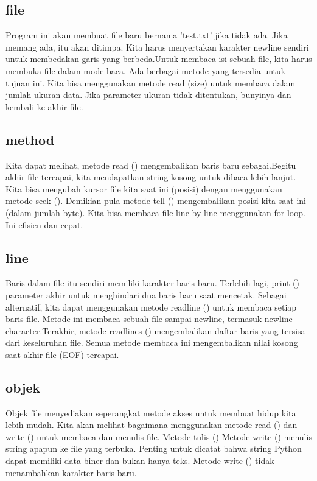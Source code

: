 \subsection{file}
Program ini akan membuat file baru bernama 'test.txt' jika tidak ada. Jika memang ada, itu akan ditimpa. Kita harus menyertakan karakter newline sendiri untuk membedakan garis yang berbeda.Untuk membaca isi sebuah file, kita harus membuka file dalam mode baca. Ada berbagai metode yang tersedia untuk tujuan ini. Kita bisa menggunakan metode read (size) untuk membaca dalam jumlah ukuran data. Jika parameter ukuran tidak ditentukan, bunyinya dan kembali ke akhir file. 

\subsection{method}
Kita dapat melihat, metode read () mengembalikan baris baru sebagai.Begitu akhir file tercapai, kita mendapatkan string kosong untuk dibaca lebih lanjut. Kita bisa mengubah kursor file kita saat ini (posisi) dengan menggunakan metode seek (). Demikian pula metode tell () mengembalikan posisi kita saat ini (dalam jumlah byte). Kita bisa membaca file line-by-line menggunakan for loop. Ini efisien dan cepat. 

\subsection{line}
Baris dalam file itu sendiri memiliki karakter baris baru. Terlebih lagi, print () parameter akhir untuk menghindari dua baris baru saat mencetak. Sebagai alternatif, kita dapat menggunakan metode readline () untuk membaca setiap baris file. Metode ini membaca sebuah file sampai newline, termasuk newline character.Terakhir, metode readlines () mengembalikan daftar baris yang tersisa dari keseluruhan file. Semua metode membaca ini mengembalikan nilai kosong saat akhir file (EOF) tercapai. 

\subsection{objek}
Objek file menyediakan seperangkat metode akses untuk membuat hidup kita lebih mudah. Kita akan melihat bagaimana menggunakan metode read () dan write () untuk membaca dan menulis file. Metode tulis () Metode write () menulis string apapun ke file yang terbuka. Penting untuk dicatat bahwa string Python dapat memiliki data biner dan bukan hanya teks. Metode write () tidak menambahkan karakter baris baru.

